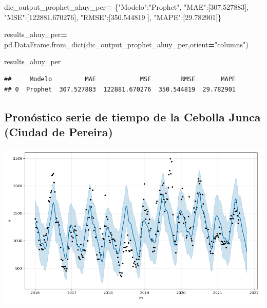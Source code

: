 \documentclass[
]{book}
\newenvironment{Shaded}{\begin{snugshade}}{\end{snugshade}}
\newcommand{\FloatTok}[1]{\textcolor[rgb]{0.00,0.00,0.81}{#1}}
\newcommand{\NormalTok}[1]{#1}
\newcommand{\OperatorTok}[1]{\textcolor[rgb]{0.81,0.36,0.00}{\textbf{#1}}}
\newcommand{\StringTok}[1]{\textcolor[rgb]{0.31,0.60,0.02}{#1}}
\begin{document}
\begin{Shaded}
\begin{Highlighting}[]

\NormalTok{dic\_output\_prophet\_ahuy\_per}\OperatorTok{=}\NormalTok{ \{}\StringTok{"Modelo"}\NormalTok{:}\StringTok{"Prophet"}\NormalTok{,}
                 \StringTok{"MAE"}\NormalTok{:[}\FloatTok{307.527883}\NormalTok{],}
                 \StringTok{"MSE"}\NormalTok{:[}\FloatTok{122881.670276}\NormalTok{],}
                 \StringTok{"RMSE"}\NormalTok{:[}\FloatTok{350.544819}\NormalTok{ ],}
                 \StringTok{"MAPE"}\NormalTok{:[}\FloatTok{29.782901}\NormalTok{]\}}

\NormalTok{results\_ahuy\_per}\OperatorTok{=}\NormalTok{ pd.DataFrame.from\_dict(dic\_output\_prophet\_ahuy\_per,orient}\OperatorTok{=}\StringTok{"columns"}\NormalTok{)}

\NormalTok{results\_ahuy\_per}
\end{Highlighting}
\end{Shaded}

\begin{verbatim}
##     Modelo         MAE            MSE        RMSE       MAPE
## 0  Prophet  307.527883  122881.670276  350.544819  29.782901
\end{verbatim}

\hypertarget{pronuxf3stico-serie-de-tiempo-de-la-cebolla-junca-ciudad-de-pereira-2}{%
\subsection{Pronóstico serie de tiempo de la Cebolla Junca (Ciudad de Pereira)}\label{pronuxf3stico-serie-de-tiempo-de-la-cebolla-junca-ciudad-de-pereira-2}}

\includegraphics{Prophet_Cebolla_PER.png}
\end{document}
